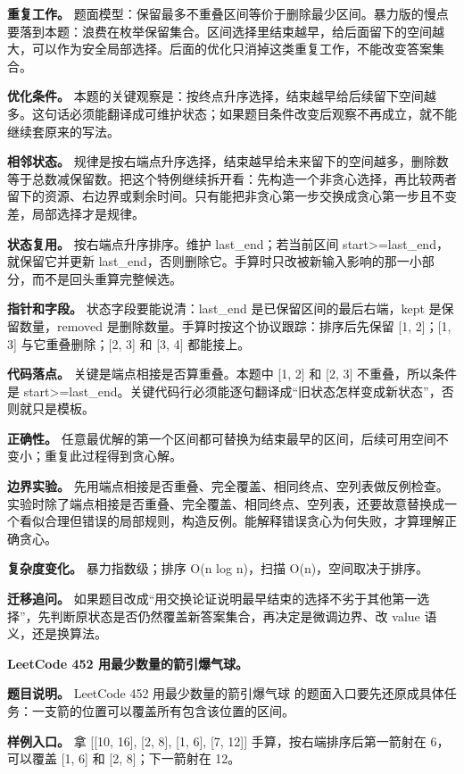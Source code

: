 \textbf{重复工作。} 题面模型：保留最多不重叠区间等价于删除最少区间。暴力版的慢点要落到本题：浪费在枚举保留集合。区间选择里结束越早，给后面留下的空间越大，可以作为安全局部选择。后面的优化只消掉这类重复工作，不能改变答案集合。

\textbf{优化条件。} 本题的关键观察是：按终点升序选择，结束越早给后续留下空间越多。这句话必须能翻译成可维护状态；如果题目条件改变后观察不再成立，就不能继续套原来的写法。

\textbf{相邻状态。} 规律是按右端点升序选择，结束越早给未来留下的空间越多，删除数等于总数减保留数。把这个特例继续拆开看：先构造一个非贪心选择，再比较两者留下的资源、右边界或剩余时间。只有能把非贪心第一步交换成贪心第一步且不变差，局部选择才是规律。

\textbf{状态复用。} 按右端点升序排序。维护 last\_end；若当前区间 start>=last\_end，就保留它并更新 last\_end，否则删除它。手算时只改被新输入影响的那一小部分，而不是回头重算完整候选。

\textbf{指针和字段。} 状态字段要能说清：last\_end 是已保留区间的最后右端，kept 是保留数量，removed 是删除数量。手算时按这个协议跟踪：排序后先保留 [1, 2]；[1, 3] 与它重叠删除；[2, 3] 和 [3, 4] 都能接上。

\textbf{代码落点。} 关键是端点相接是否算重叠。本题中 [1, 2] 和 [2, 3] 不重叠，所以条件是 start>=last\_end。关键代码行必须能逐句翻译成“旧状态怎样变成新状态”，否则就只是模板。

\textbf{正确性。} 任意最优解的第一个区间都可替换为结束最早的区间，后续可用空间不变小；重复此过程得到贪心解。

\textbf{边界实验。} 先用端点相接是否重叠、完全覆盖、相同终点、空列表做反例检查。实验时除了端点相接是否重叠、完全覆盖、相同终点、空列表，还要故意替换成一个看似合理但错误的局部规则，构造反例。能解释错误贪心为何失败，才算理解正确贪心。

\textbf{复杂度变化。} 暴力指数级；排序 O(n log n)，扫描 O(n)，空间取决于排序。

\textbf{迁移追问。} 如果题目改成“用交换论证说明最早结束的选择不劣于其他第一选择”，先判断原状态是否仍然覆盖新答案集合，再决定是微调边界、改 value 语义，还是换算法。

\noindent\textbf{LeetCode 452 用最少数量的箭引爆气球。}

\textbf{题目说明。} LeetCode 452 用最少数量的箭引爆气球 的题面入口要先还原成具体任务：一支箭的位置可以覆盖所有包含该位置的区间。

\textbf{样例入口。} 拿 [[10, 16], [2, 8], [1, 6], [7, 12]] 手算，按右端排序后第一箭射在 6，可以覆盖 [1, 6] 和 [2, 8]；下一箭射在 12。

